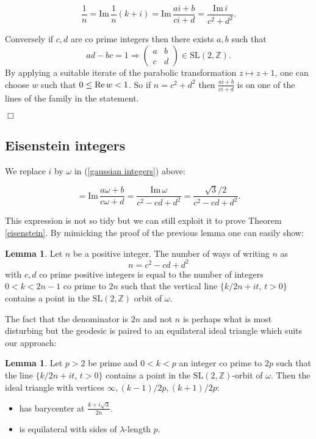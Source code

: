 \documentclass[12pt]{amsart}
\theoremstyle{plain}
\theoremstyle{definition}
\newtheorem{lem}[thm]{Lemma}
\def\im{\mathrm{Im}\,}
\def\ZZ{\mathbb{Z}}
\def\sl2{\mathrm{SL}(2, \ZZ)}
\begin{document}
\begin{equation}
\label{gaussian integers}
\frac{1}{n} = \im \frac{1 }{n}(k + i)  
= \im  \frac{ai +b}{ci+d }
= \frac{\im i} {c^2 + d^2}.
\end{equation}

Conversely if $c,d$ are co prime integers 
 then there exists $a,b$ such that
 $$ad - bc = 1 \Rightarrow  
 \begin{pmatrix}
 a & b \\
 c & d
 \end{pmatrix} \in \sl2.
$$
By applying a suitable iterate of the parabolic transformation 
$z \mapsto z + 1$,
one can choose $w$ such that $0 \leq \text{Re\,} w < 1$.
So if $n = c^2 + d^2$ then $\frac{ai +b}{ci+d }$
is on one of the lines of the family in the statement.

\hfill $\Box$

\subsection{Eisenstein integers}

We replace $i$ by $\omega$ in (\ref{gaussian integers}) above:

\begin{equation}
\label{eisen  integers}
= \im  \frac{a \omega +b}{c \omega+d }
= \frac{\im \omega} {c^2  - cd  + d^2} 
= \frac{\sqrt{3}/2} {c^2  - cd  + d^2}.
\end{equation}

This expression is not so tidy but we can still exploit it 
to prove Theorem \ref{eisenstein}. 
By mimicking the proof of the previous lemma 
one can easily show:


\begin{lem} \label{cubes}
Let $n$ be a positive integer.
The number of  ways of writing $n$  as 
$$n = c^2  - cd  + d^2$$
with $c,d$ co prime positive  integers
is equal to the number of  integers $0 < k < 2n-1$ co prime to $2n$
such that the vertical line
$\{  k/2n + i t,\, t >0 \}$
contains  a point in the $\sl2$  orbit of $\omega$.
\end{lem}

The fact that the denominator is $2n$ and not $n$ 
is perhaps what is most disturbing but
 the geodesic is paired to an equilateral ideal triangle
which suits our approach:

\begin{lem} \label{cubes}
Let $p>2$ be prime and $0 < k < p$ an integer 
co prime to $2p$ such that the line $\{  k/2n + i t,\, t >0 \}$
contains  a point in the $\sl2$-orbit of $\omega$.
Then the ideal triangle 
with vertices $\infty, (k-1)/2p, (k+1)/2p$:
\begin{itemize}
\item has barycenter at $\frac{ k + i \sqrt{3}}{2n}$.
\item is equilateral  with sides of $\lambda$-length $p$.
\end{itemize}
\end{lem}
\end{document}
